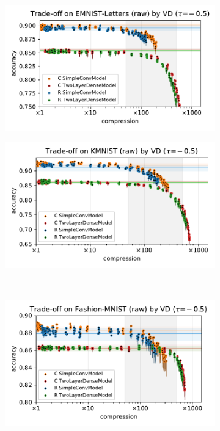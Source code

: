 \documentclass[a4paper]{extarticle}
\begin{document}
\begin{figure}[ht]
  \centering
  \begin{subfigure}[b]{0.5\textwidth}
    \centering
    \includegraphics[width=\linewidth]{../figure__mnist-like__trade-off/legacy__VD__emnist_letters__raw__-0.5.pdf}
  \end{subfigure}%
  \begin{subfigure}[b]{0.5\textwidth}
    \centering
    \includegraphics[width=\linewidth]{../figure__mnist-like__trade-off/legacy__VD__kmnist__raw__-0.5.pdf}
  \end{subfigure} \\%
  \begin{subfigure}[b]{0.5\textwidth}
    \centering
    \includegraphics[width=\linewidth]{../figure__mnist-like__trade-off/legacy__VD__fashionmnist__raw__-0.5.pdf}

\end{subfigure}
\end{figure}
\end{document}
